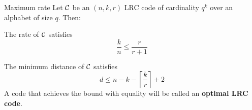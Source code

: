 \begin{frame}{Maximum rate}
	Let $\mathcal{C}$ be an $(n,k,r)$ LRC code of cardinality $q^k$ over an alphabet of size $q$. Then:
    \begin{thm}
        The rate of $\mathcal{C}$ satisfies
        $$ \frac{k}{n} \leq \frac{r}{r+1} $$
    \end{thm}
    
    \begin{thm}
        The minimum distance of $\mathcal{C}$ satisfies
            $$d \leq n - k - \left\lceil \frac{k}{r} \right\rceil + 2$$
        A code that achieves the bound with equality will be called an \textbf{optimal LRC code}.
    \end{thm}
\end{frame}